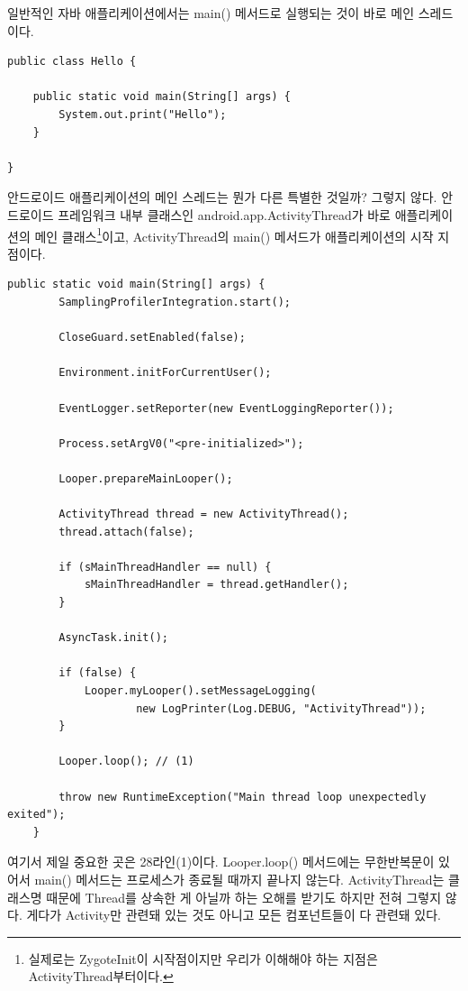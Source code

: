 일반적인 자바 애플리케이션에서는 main() 메서드로 실행되는 것이 바로 메인 스레드이다.
\begin{lstlisting}[frame=single] 
public class Hello {

	public static void main(String[] args) {
		System.out.print("Hello");
	}

}
\end{lstlisting}

안드로이드 애플리케이션의 메인 스레드는 뭔가 다른 특별한 것일까? 그렇지 않다. 
안드로이드 프레임워크 내부 클래스인 android.app.ActivityThread가 바로 애플리케이션의 메인 클래스\footnote{실제로는 ZygoteInit이 시작점이지만 우리가 이해해야 하는 지점은 ActivityThread부터이다.}이고, ActivityThread의 main() 메서드가 애플리케이션의 시작 지점이다.\newpage

\begin{lstlisting}[frame=single, caption=ActivityThread.java] 
	public static void main(String[] args) {
		SamplingProfilerIntegration.start();

		CloseGuard.setEnabled(false);

		Environment.initForCurrentUser();

		EventLogger.setReporter(new EventLoggingReporter());

		Process.setArgV0("<pre-initialized>");

		Looper.prepareMainLooper();

		ActivityThread thread = new ActivityThread();
		thread.attach(false);

		if (sMainThreadHandler == null) {
			sMainThreadHandler = thread.getHandler();
		}

		AsyncTask.init();

		if (false) {
			Looper.myLooper().setMessageLogging(
					new LogPrinter(Log.DEBUG, "ActivityThread"));
		}

		Looper.loop(); // (1)

		throw new RuntimeException("Main thread loop unexpectedly exited");
	}
\end{lstlisting}

여기서 제일 중요한 곳은 28라인(1)이다. 
Looper.loop() 메서드에는 무한반복문이 있어서 main() 메서드는 프로세스가 종료될 때까지 끝나지 않는다.
ActivityThread는 클래스명 때문에 Thread를 상속한 게 아닐까 하는 오해를 받기도 하지만 전혀 그렇지 않다.
게다가 Activity만 관련돼 있는 것도 아니고 모든 컴포넌트들이 다 관련돼 있다.



